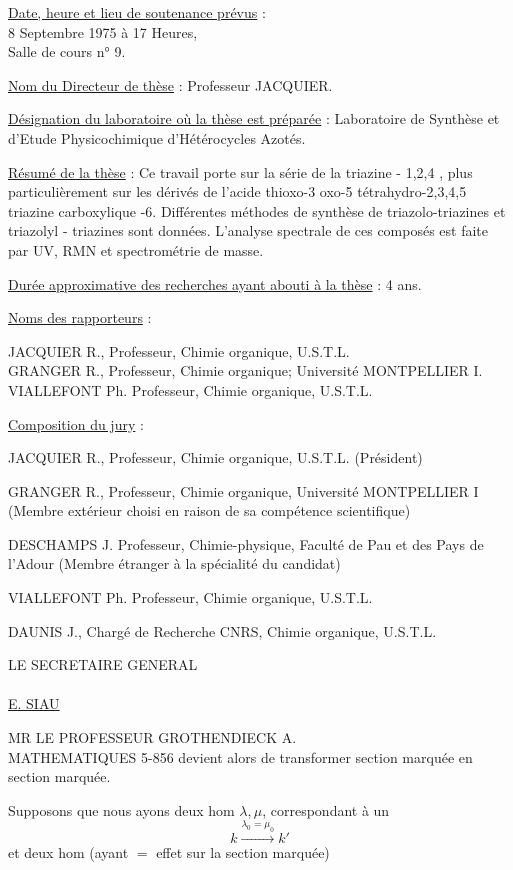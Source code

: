 \uline{Date, heure et lieu de soutenance prévus} :\\
8 Septembre 1975 à 17 Heures,\\
Salle de cours n° 9.

\uline{Nom du Directeur de thèse} : Professeur JACQUIER.

\uline{Désignation du laboratoire où la thèse est préparée} : Laboratoire de Synthèse et d'Etude Physicochimique d'Hétérocycles Azotés.

\uline{Résumé de la thèse} : Ce travail porte sur la série de la triazine - 1,2,4 , plus particulièrement sur les dérivés de l'acide thioxo-3 oxo-5 tétrahydro-2,3,4,5 triazine carboxylique -6. Différentes méthodes de synthèse de triazolo-triazines et triazolyl - triazines sont données. L'analyse spectrale de ces composés est faite par UV, RMN et spectrométrie de masse.

\uline{Durée approximative des recherches ayant abouti à la thèse} : 4 ans.

\uline{Noms des rapporteurs} :

JACQUIER R., Professeur, Chimie organique, U.S.T.L.\\
GRANGER R., Professeur, Chimie organique; Université MONTPELLIER I.\\
VIALLEFONT Ph. Professeur, Chimie organique, U.S.T.L.

\uline{Composition du jury} :

JACQUIER R., Professeur, Chimie organique, U.S.T.L. (Président)

GRANGER R., Professeur, Chimie organique, Université MONTPELLIER I (Membre extérieur choisi en raison de sa compétence scientifique)

DESCHAMPS J. Professeur, Chimie-physique, Faculté de Pau et des Pays de l'Adour (Membre étranger à la spécialité du candidat)

VIALLEFONT Ph. Professeur, Chimie organique, U.S.T.L.

DAUNIS J., Chargé de Recherche CNRS, Chimie organique, U.S.T.L.

LE SECRETAIRE GENERAL\\
\\
\uline{E. SIAU}

MR LE PROFESSEUR GROTHENDIECK A.\\
MATHEMATIQUES \hfill 5-856
devient alors de transformer section marquée en section marquée.

Supposons que nous ayons deux hom $\lambda,\mu$, correspondant à un \uuline{$=$} 
\[
k\xrightarrow{\lambda_0=\mu_0}k'
\]
et deux hom
(ayant $=$ effet sur la section marquée)

